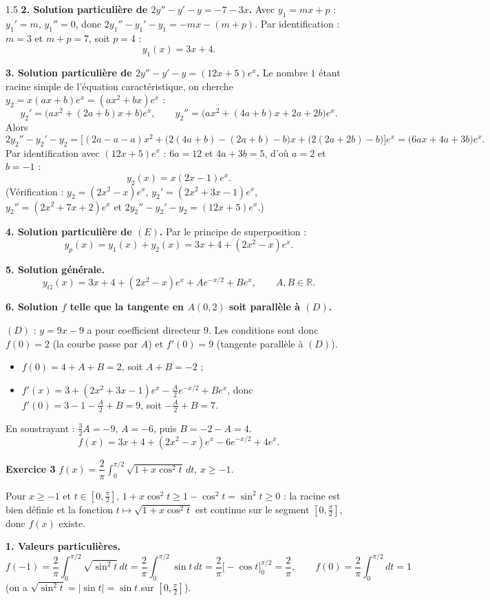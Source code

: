 \documentclass[12pt]{article}
\begin{document}
\begin{spacing}{1.5}
\textbf{2. Solution particulière de $2y''-y'-y=-7-3x$.} Avec $y_1=mx+p$ : $y_1'=m$, $y_1''=0$, donc $2y_1''-y_1'-y_1=-mx-(m+p)$. Par identification : $m=3$ et $m+p=7$, soit $p=4$ :
\[
y_1(x)=3x+4 .
\]

\textbf{3. Solution particulière de $2y''-y'-y=(12x+5)e^x$.} Le nombre $1$ étant racine simple de l'équation caractéristique, on cherche $y_2=x(ax+b)e^x=(ax^2+bx)e^x$ :
\[
y_2'=\big(ax^2+(2a+b)x+b\big)e^x,\qquad y_2''=\big(ax^2+(4a+b)x+2a+2b\big)e^x .
\]
Alors
\[
2y_2''-y_2'-y_2=\big[(2a-a-a)x^2+\big(2(4a+b)-(2a+b)-b\big)x+\big(2(2a+2b)-b\big)\big]e^x=\big(6ax+4a+3b\big)e^x .
\]
Par identification avec $(12x+5)e^x$ : $6a=12$ et $4a+3b=5$, d'où $a=2$ et $b=-1$ :
\[
\boxed{y_2(x)=x(2x-1)e^x}.
\]
(Vérification : $y_2=(2x^2-x)e^x$, $y_2'=(2x^2+3x-1)e^x$, $y_2''=(2x^2+7x+2)e^x$ et $2y_2''-y_2'-y_2=(12x+5)e^x$.)

\textbf{4. Solution particulière de $(E)$.} Par le principe de superposition :
\[
y_p(x)=y_1(x)+y_2(x)=3x+4+(2x^2-x)e^x .
\]

\textbf{5. Solution générale.}
\[
\boxed{y_G(x)=3x+4+(2x^2-x)e^x+Ae^{-x/2}+Be^x,\qquad A,B\in\mathbb{R}}.
\]

\textbf{6. Solution $f$ telle que la tangente en $A(0,2)$ soit parallèle à $(D)$.}

$(D)$ : $y=9x-9$ a pour coefficient directeur $9$. Les conditions sont donc $f(0)=2$ (la courbe passe par $A$) et $f'(0)=9$ (tangente parallèle à $(D)$).
\begin{itemize}
\item $f(0)=4+A+B=2$, soit $A+B=-2$ ;
\item $f'(x)=3+(2x^2+3x-1)e^x-\frac A2e^{-x/2}+Be^x$, donc $f'(0)=3-1-\frac A2+B=9$, soit $-\frac A2+B=7$.
\end{itemize}
En soustrayant : $\frac32A=-9$, $A=-6$, puis $B=-2-A=4$.
\[
\boxed{f(x)=3x+4+(2x^2-x)e^x-6e^{-x/2}+4e^x}.
\]

\medskip\textbf{Exercice 3} \quad $f(x)=\dfrac2\pi\displaystyle\int_0^{\pi/2}\sqrt{1+x\cos^2t}\,dt$, $x\ge-1$.

Pour $x\ge-1$ et $t\in[0,\frac\pi2]$, $1+x\cos^2t\ge1-\cos^2t=\sin^2t\ge0$ : la racine est bien définie et la fonction $t\mapsto\sqrt{1+x\cos^2t}$ est continue sur le segment $[0,\frac\pi2]$, donc $f(x)$ existe.

\textbf{1. Valeurs particulières.}
\[
f(-1)=\frac2\pi\int_0^{\pi/2}\sqrt{\sin^2t}\,dt=\frac2\pi\int_0^{\pi/2}\sin t\,dt=\frac2\pi\Big[-\cos t\Big]_0^{\pi/2}=\boxed{\frac2\pi},
\qquad f(0)=\frac2\pi\int_0^{\pi/2}dt=\boxed{1}
\]
(on a $\sqrt{\sin^2t}=|\sin t|=\sin t$ sur $[0,\frac\pi2]$).


\end{spacing}
\end{document}
